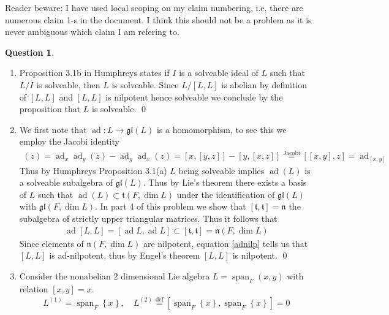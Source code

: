 \documentclass[10.5pt]{article}
\theoremstyle{definition}
\newtheorem{pb}{Question}
\numberwithin{example}{subsection}
\numberwithin{proposition}{subsection}
\newcommand{\set}[1]{\left\{#1\right\}}
\begin{document}
    Reader beware: I have used local scoping on my claim numbering, i.e. there are numerous claim 1-s in the document. I think this should not be a problem as it is never ambiguous which claim I am refering to.

    \begin{pb}
        \begin{enumerate}
            \item Proposition 3.1b in Humphreys states if \(I\) is a solveable ideal of \(L\) such that \(L/I\) is solveable, then \(L\) is solveable. Since \(L/[L,L]\) is abelian by definition of \([L,L]\) and \([L,L]\) is nilpotent hence solveable we conclude by the proposition that \(L\) is solveable. \qed
            \item We first note that \(\operatorname{ad}: L \to \mathfrak{gl}(L)\) is a homomorphism, to see this we employ the Jacobi identity
            \begin{align}
                [\operatorname{ad}_x,\operatorname{ad}_y](z) = \operatorname{ad}_x \operatorname{ad}_y(z) - \operatorname{ad}_y \operatorname{ad}_x(z) = [x,[y,z]] - [y,[x,z]] \overset{\text{Jacobi}}{=} [[x,y],z] = \operatorname{ad}_{[x,y]}
            \end{align}
            Thus by Humphreys Proposition 3.1(a) \(L\) being solveable implies \(\operatorname{ad}(L)\) is a solveable subalgebra of \(\mathfrak{gl}(L)\). Thus by Lie's theorem there exists a basis of \(L\) such that \(\operatorname{ad}(L) \subset \mathfrak{t}(F,\dim L)\) under the identification of \(\mathfrak{gl}(L)\) with \(\mathfrak{gl}(F,\dim L)\). In part 4 of this problem we show that \([\mathfrak{t},\mathfrak{t}] = \mathfrak{n}\) the subalgebra of strictly upper triangular matrices. Thus it follows that 
            \begin{align}
                \operatorname{ad}[L,L] = [\operatorname{ad}L,\operatorname{ad}L] \subset [\mathfrak{t},\mathfrak{t}] = \mathfrak{n}(F,\dim L) \label{adnilp}
            \end{align}
            Since elements of \(\mathfrak{n}(F,\dim L)\) are nilpotent, equation \eqref{adnilp} tells us that \([L,L]\) is ad-nilpotent, thus by Engel's theorem \([L,L]\) is nilpotent. \qed
            \item Consider the nonabelian 2 dimensional Lie algebra \(L = \operatorname{span}_F(x,y)\) with relation \([x,y] = x\).
            \begin{align}
                L^{(1)} = \operatorname{span}_F\set{x}, \quad L^{(2)} \overset{\text{def}}{=} [\operatorname{span}_F\set{x},\operatorname{span}_F\set{x}] = 0

\end{align}
\end{enumerate}
\end{pb}
\end{document}
